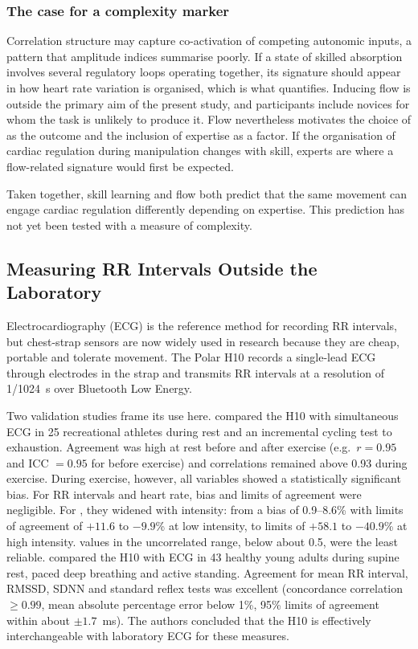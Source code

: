 \subsubsection{The case for a complexity marker}

Correlation structure may capture co-activation of competing autonomic inputs, a pattern that amplitude indices summarise poorly. If a state of skilled absorption involves several regulatory loops operating together, its signature should appear in how heart rate variation is organised, which is what \al{} quantifies. Inducing flow is outside the primary aim of the present study, and participants include novices for whom the task is unlikely to produce it. Flow nevertheless motivates the choice of \al{} as the outcome and the inclusion of expertise as a factor. If the organisation of cardiac regulation during manipulation changes with skill, experts are where a flow-related signature would first be expected.

Taken together, skill learning and flow both predict that the same movement can engage cardiac regulation differently depending on expertise. This prediction has not yet been tested with a measure of complexity.

\subsection{Measuring RR Intervals Outside the Laboratory}
\label{sec:bg-h10}

Electrocardiography (ECG) is the reference method for recording RR intervals, but chest-strap sensors are now widely used in research because they are cheap, portable and tolerate movement. The Polar H10 records a single-lead ECG through electrodes in the strap and transmits RR intervals at a resolution of 1/1024~s over Bluetooth Low Energy.

Two validation studies frame its use here. \citet{schaffarczyk2022} compared the H10 with simultaneous ECG in 25 recreational athletes during rest and an incremental cycling test to exhaustion. Agreement was high at rest before and after exercise (e.g.\ $r = 0.95$ and ICC $= 0.95$ for \al{} before exercise) and correlations remained above 0.93 during exercise. During exercise, however, all variables showed a statistically significant bias. For RR intervals and heart rate, bias and limits of agreement were negligible. For \al, they widened with intensity: from a bias of 0.9--8.6\% with limits of agreement of $+11.6$ to $-9.9$\% at low intensity, to limits of $+58.1$ to $-40.9$\% at high intensity. \al{} values in the uncorrelated range, below about 0.5, were the least reliable. \citet{blalock2026} compared the H10 with ECG in 43 healthy young adults during supine rest, paced deep breathing and active standing. Agreement for mean RR interval, RMSSD, SDNN and standard reflex tests was excellent (concordance correlation $\geq 0.99$, mean absolute percentage error below 1\%, 95\% limits of agreement within about $\pm 1.7$~ms). The authors concluded that the H10 is effectively interchangeable with laboratory ECG for these measures.

